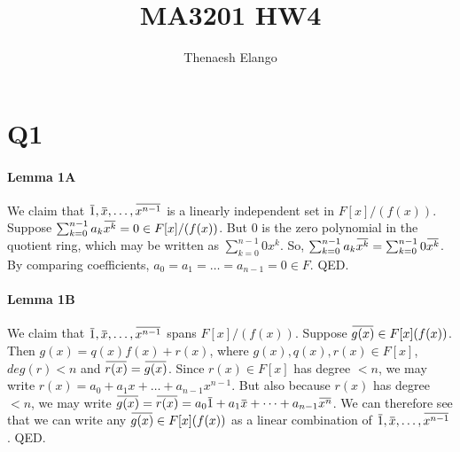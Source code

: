 \documentclass[]{article}
\title{MA3201 HW4}
\author{Thenaesh Elango}
\begin{document}
\newcommand{\overbar}[1]{\mkern 1.5mu\overline{\mkern-1.5mu#1\mkern-1.5mu}\mkern 1.5mu}
\maketitle

\section*{Q1}
	\paragraph{Lemma 1A}
	We claim that $\overbar{1}, \overbar{x}, \dots, \overbar{x^{n-1}}$ is a linearly independent set in $F[x]/(f(x))$.\newline
	Suppose $\sum_{k=0}^{n-1} a_k\overbar{x^k} = 0 \in F[x]/(f(x))$.\newline
	But $0$ is the zero polynomial in the quotient ring, which may be written as $\sum_{k=0}^{n-1} 0x^k$.\newline
	So, $\sum_{k=0}^{n-1} a_k\overbar{x^k} = \sum_{k=0}^{n-1} 0\overbar{x^k}$.\newline
	By comparing coefficients, $a_0 = a_1 = \dots = a_{n-1} = 0 \in F$.\newline
	QED.
	\paragraph{Lemma 1B}
	We claim that $\overbar{1}, \overbar{x}, \dots, \overbar{x^{n-1}}$ spans $F[x]/(f(x))$.\newline
	Suppose $\overbar{g(x)} \in F[x](f(x))$.\newline
	Then $g(x) = q(x)f(x) + r(x)$, where $g(x), q(x), r(x) \in F[x]$, $deg(r) < n$ and $\overbar{r(x)} = \overbar{g(x)}$.\newline
	Since $r(x) \in F[x]$ has degree $< n$, we may write $r(x) = a_0 + a_1x + \dots + a_{n-1}x^{n-1}$.\newline
	But also because $r(x)$ has degree $< n$, we may write $\overbar{g(x)} = \overbar{r(x)} = a_0\overbar{1} + a_1\overbar{x} + \dots + a_{n-1}\overbar{x^n}$.\newline
	We can therefore see that we can write any $\overbar{g(x)} \in F[x](f(x))$ as a linear combination of $\overbar{1}, \overbar{x}, \dots, \overbar{x^{n-1}}$.\newline
	QED.
\end{document}

